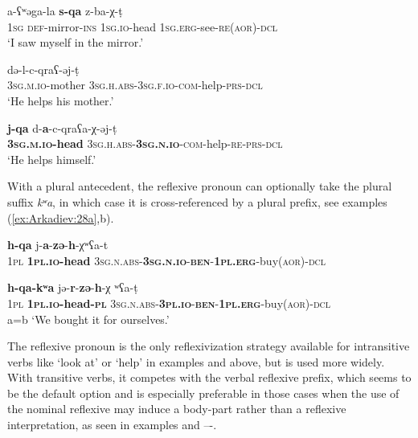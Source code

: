 \documentclass[output=paper]{langscibook}
\begin{document}
    \ex 
    \label{ex:Arkadiev:26b}
     {a-{ʕ}{ʷ}{ə}ga-la} \textbf{{s-qa}}  {z-ba-χ-t{̣}}\\
     \textsc{1sg}  \textsc{def}{}-mirror-\textsc{ins}  \textsc{1sg.io}{}-head  \textsc{1sg.erg}{}-see-\textsc{re(aor)-dcl}\\
    \glt    ‘I saw myself in the mirror.’
\z
\z

    
\ea 
\label{ex:Arkadiev:27}
    \ea 
    \label{ex:Arkadiev:27a}
      {d{ə}-l-c-qra{ʕ}-{ə}j-t{̣}}\\
       \textsc{3sg.m.io}{}-mother  \textsc{3sg.h.abs-3sg.f.io-com}{}-help-\textsc{prs-dcl}\\
    \glt ‘He helps his mother.’
    
    \ex 
    \label{ex:Arkadiev:27b}
    \gll  \textbf{j-qa} {d-}\textbf{{a}}{{}-c-qra{ʕ}a-χ-{ə}j-t{̣}}\\
     \textbf{\textsc{3sg.m.io}}\textbf{-head} \textsc{3sg.h.abs-}\textbf{\textsc{3sg.n.io}}\textsc{{}-com}{}-help-\textsc{re-prs-dcl}\\
    \glt ‘He helps himself.’
\z
\z

With a plural antecedent, the reflexive pronoun can optionally take the plural suffix \textit{k{ʷ}a}, in which case it is cross-referenced by a plural prefix, see examples (\ref{ex:Arkadiev:28a},b).

  
\ea 
\label{ex:Arkadiev:28}
    \ea 
    \label{ex:Arkadiev:28a}
      \textbf{h-qa} {j-}\textbf{a}-\textbf{zə}-\textbf{h}-χʷʕa-t\\
       \textsc{1pl} \textbf{\textsc{1pl.io}}\textbf{-head} \textsc{3sg.n.abs-}\textbf{\textsc{3sg.n.io}}\textsc{{}-}\textbf{\textsc{ben}}-\textbf{\textsc{1pl.erg}}-buy(\textsc{aor)-dcl}\\
    \glt 
    
    \ex 
    \label{ex:Arkadiev:28b}
     \textbf{{h-qa-kʷa}} {jə-}\textbf{r}{{}-}\textbf{{zə}}{{}-}\textbf{{h}}{{}-χ {ʷ}{ʕ}a-t{̣}}\\
     \textsc{1pl}  \textbf{\textsc{1pl.io}}\textbf{{}-head-}\textbf{\textsc{pl}}  \textsc{3sg.n.abs-}\textbf{\textsc{3pl.io}}\textsc{{}-}\textbf{\textsc{ben}}\textsc{{}-}\textbf{\textsc{1pl.erg}}{}-buy(\textsc{aor)-dcl}\\
    \glt a=b ‘We bought it for ourselves.’
\z
\z


The reflexive pronoun is the only reflexivization strategy available for intransitive verbs like ‘look at’ or ‘help’ in examples  and  above, but is used more widely. With transitive verbs, it competes with the verbal reflexive prefix, which seems to be the default option and is especially preferable in those cases when the use of the nominal reflexive may induce a body-part rather than a reflexive interpretation, as seen in examples  and –-. 
\end{document}
